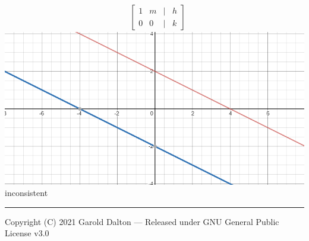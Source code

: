 \documentclass[14pt]{extarticle}
\begin{document}
\begin{multicols}{3}
\begin{align*}
		&\begin{bmatrix}
			1 & m & | & h\\
			0 & 0 & | & k
		\end{bmatrix} 
	\end{align*}
\includegraphics[width=1.0\linewidth]{4-1_a-15}
inconsistent\\
\vfill\null
\end{multicols}

\noindent\rule{\textwidth}{1pt}
{\footnotesize Copyright (C) 2021 Garold Dalton --- Released under GNU General Public License v3.0}
\end{document}
